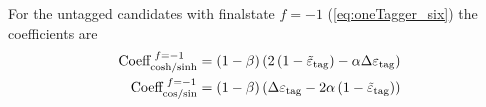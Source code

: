 For the untagged candidates with finalstate $f=-1$ (\cref{eq:oneTagger_six}) the coefficients are
\begin{align*}
\text{Coeff}_\text{cosh/sinh}^{\hspace{0.3em}f=-1} &= \left(1-\beta\right)\left(2\left(1-\tilde{\varepsilon}_\text{tag}\right)
   -\alpha\Delta\varepsilon_\text{tag}\right)\\
   \text{Coeff}_\text{cos/sin}^{\hspace{0.3em}f=-1} &= \left(1-\beta\right)\left(\Delta\varepsilon_\text{tag}
   -2\alpha\left(1-\tilde{\varepsilon}_\text{tag}\right)\right)
\end{align*}
